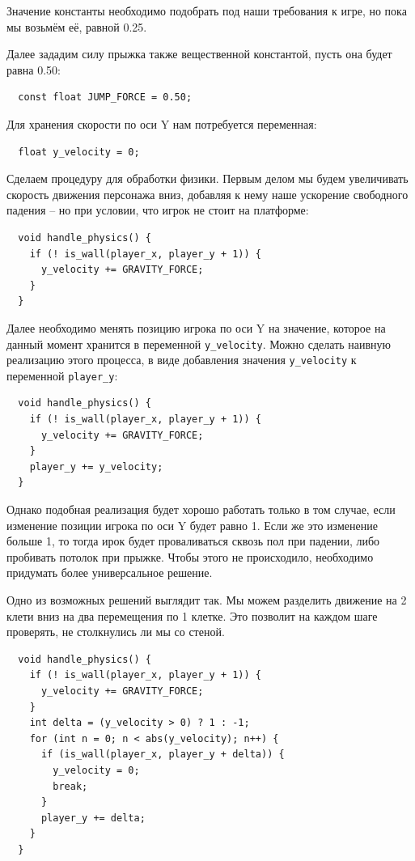 \documentclass[../sparc.tex]{subfiles}
\begin{document}
Значение константы необходимо подобрать под наши требования к игре, но пока мы
возьмём её, равной 0.25.

Далее зададим силу прыжка также вещественной константой, пусть она будет равна
0.50:
\begin{verbatim}
  const float JUMP_FORCE = 0.50;
\end{verbatim}

Для хранения скорости по оси Y нам потребуется переменная:
\begin{verbatim}
  float y_velocity = 0;
\end{verbatim}

Сделаем процедуру для обработки физики.  Первым делом мы будем увеличивать
скорость движения персонажа вниз, добавляя к нему наше ускорение свободного
падения -- но при условии, что игрок не стоит на платформе:

\begin{verbatim}
  void handle_physics() {
    if (! is_wall(player_x, player_y + 1)) {
      y_velocity += GRAVITY_FORCE;
    }
  }
\end{verbatim}

Далее необходимо менять позицию игрока по оси Y на значение, которое на данный
момент хранится в переменной \texttt{y_velocity}.  Можно сделать
наивную реализацию этого процесса, в виде добавления значения
\texttt{y_velocity} к переменной \texttt{player_y}:

\begin{verbatim}
  void handle_physics() {
    if (! is_wall(player_x, player_y + 1)) {
      y_velocity += GRAVITY_FORCE;
    }
    player_y += y_velocity;
  }
\end{verbatim}

Однако подобная реализация будет хорошо работать только в том случае, если
изменение позиции игрока по оси Y будет равно 1.  Если же это изменение больше
1, то тогда ирок будет проваливаться сквозь пол при падении, либо пробивать
потолок при прыжке.  Чтобы этого не происходило, необходимо придумать более
универсальное решение.

Одно из возможных решений выглядит так.  Мы можем разделить движение на 2 клети
вниз на два перемещения по 1 клетке.  Это позволит на каждом шаге проверять, не
столкнулись ли мы со стеной.

\begin{verbatim}
  void handle_physics() {
    if (! is_wall(player_x, player_y + 1)) {
      y_velocity += GRAVITY_FORCE;
    }
    int delta = (y_velocity > 0) ? 1 : -1;
    for (int n = 0; n < abs(y_velocity); n++) {
      if (is_wall(player_x, player_y + delta)) {
        y_velocity = 0;
        break;
      }
      player_y += delta;
    }
  }
\end{verbatim}
\end{document}
